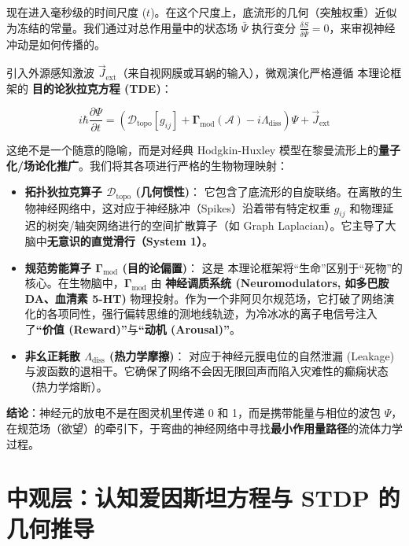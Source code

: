 现在进入毫秒级的时间尺度 ($t$)。在这个尺度上，底流形的几何（突触权重）近似为冻结的常量。我们通过对总作用量中的状态场 $\bar{\Psi}$ 执行变分 $\frac{\delta S}{\delta \bar{\Psi}} = 0$，来审视神经冲动是如何传播的。


引入外源感知激波 $\vec{J}_{\text{ext}}$（来自视网膜或耳蜗的输入），微观演化严格遵循 本理论框架的 \textbf{目的论狄拉克方程 (TDE)}：

\begin{equation}
    \boxed{ i\hbar \frac{\partial \Psi}{\partial t} = \left( \mathcal{D}_{\text{topo}}[g_{ij}] + \mathbf{\Gamma}_{\text{mod}}(\mathcal{A}) - i\Lambda_{\text{diss}} \right) \Psi + \vec{J}_{\text{ext}} }
\end{equation}

这绝不是一个随意的隐喻，而是对经典 Hodgkin-Huxley 模型在黎曼流形上的\textbf{量子化/场论化推广}。我们将其各项进行严格的生物物理映射：

\begin{itemize}
    \item \textbf{\textcolor{structurecolor}{拓扑狄拉克算子 $\mathcal{D}_{\text{topo}}$ (几何惯性)}}：
    它包含了底流形的自旋联络。在离散的生物神经网络中，这对应于神经脉冲（Spikes）沿着带有特定权重 $g_{ij}$ 和物理延迟的树突/轴突网络进行的空间扩散算子（如 Graph Laplacian）。它主导了大脑中\textbf{无意识的直觉滑行（System 1）}。

    \item \textbf{\textcolor{structurecolor}{规范势能算子 $\mathbf{\Gamma}_{\text{mod}}$ (目的论偏置)}}：
    这是 本理论框架将“生命”区别于“死物”的核心。在生物脑中，$\mathbf{\Gamma}_{\text{mod}}$ 由 \textbf{神经调质系统 (Neuromodulators, 如多巴胺 DA、血清素 5-HT)} 物理投射。作为一个非阿贝尔规范场，它打破了网络演化的各项同性，强行偏转思维的测地线轨迹，为冷冰冰的离子电信号注入了\textbf{“价值 (Reward)”}与\textbf{“动机 (Arousal)”}。

    \item \textbf{\textcolor{structurecolor}{非幺正耗散 $\Lambda_{\text{diss}}$ (热力学摩擦)}}：
    对应于神经元膜电位的自然泄漏 (Leakage) 与波函数的退相干。它确保了网络不会因无限回声而陷入灾难性的癫痫状态（热力学熔断）。
\end{itemize}

\textbf{结论}：神经元的放电不是在图灵机里传递 0 和 1，而是携带能量与相位的波包 $\Psi$，在规范场（欲望）的牵引下，于弯曲的神经网络中寻找\textbf{最小作用量路径}的流体力学过程。

\section{中观层：认知爱因斯坦方程与 STDP 的几何推导}
\label{sec:meso_cefe_and_stdp}

